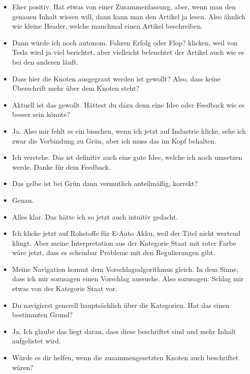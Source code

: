 {\begin{itemize}[]
        \item {} Eher positiv.
              Hat etwas von einer Zusammenfassung, aber, wenn man den genauen Inhalt wissen will, dann kann man den Artikel ja lesen.
              Also ähnlich wie kleine Header, welche manchmal einen Artikel beschreiben.
        \item {} Dann würde ich noch \flqq autonom. Fahren Erfolg oder Flop?\frqq{} klicken, weil von Tesla wird ja viel berichtet, aber vielleicht beleuchtet der Artikel auch wie es bei den anderen läuft.
        \item {} Dass hier die Knoten ausgegraut werden ist gewollt?
              Also, dass keine Überschrift mehr über dem Knoten steht?
        \item {} Aktuell ist das gewollt. Hättest du dazu denn eine Idee oder Feedback wie es besser sein könnte?
        \item {} Ja. Also mir fehlt es ein bisschen, wenn ich jetzt auf Industrie klicke, sehe ich zwar die Verbindung zu Grün, aber ich muss das im Kopf behalten.
        \item {} Ich verstehe. Das ist definitiv auch eine gute Idee, welche ich noch umsetzen werde. Danke für dein Feedback.
        \item {} Das gelbe ist bei Grün dann vermutlich anteilmäßig, korrekt?
        \item {} Genau.
        \item {} Alles klar. Das hätte ich so jetzt auch intuitiv gedacht.
        \item {} Ich klicke jetzt auf \flqq Rohstoffe für E-Auto Akku\frqq{}, weil der Titel nicht wertend klingt.
              Aber meine Interpretation aus der Kategorie Staat mit roter Farbe wäre jetzt, dass es scheinbar Probleme mit den Regulierungen gibt.
        \item {} Meine Navigation kommt dem Vorschlagsalgorithmus gleich.
              In dem Sinne, dass ich mir sozusagen einen Vorschlag aussuche.
              Also sozusagen: Schlag mir etwas von der Kategorie Staat vor.
        \item {} Du navigierst generell hauptsächlich über die Kategorien. Hat das einen bestimmten Grund?
        \item {} Ja. Ich glaube das liegt daran, dass diese beschriftet sind und mehr Inhalt aufgelistet wird.
        \item {} Würde es dir helfen, wenn die zusammengesetzten Knoten auch beschriftet wären?

\end{itemize}}
